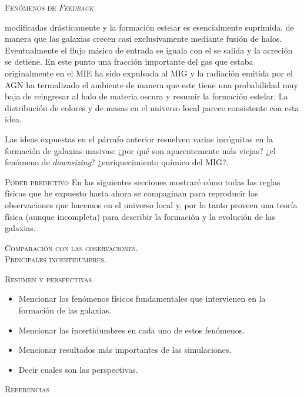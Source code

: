 \documentclass[xcolor=dvipsnames,4pt,hyperref={colorlinks,citecolor=black,linkcolor=black,urlcolor=black}]{beamer}
\begin{document}
\begin{frame}[allowframebreaks]{\textsc{Fenómenos de \emph{Feedback}}}
\begin{description}
modificadas drásticamente y la formación estelar es esencialmente suprimida, de manera que las
galaxias crecen casi exclusivamente mediante fusión de halos. Eventualmente el flujo másico de
entrada se iguala con el se salida y la acreción se detiene. En este punto una fracción importante
del gas que estaba originalmente en el MIE ha sido expulsada al MIG y la radiación emitida por el
AGN ha termalizado el ambiente de manera que este tiene una probabilidad muy baja de reingresar al
halo de materia oscura y resumir la formación estelar. La distribución de colores y de masas en el
universo local parece consistente con esta idea.

Las ideas expuestas en el párrafo anterior resuelven varias incógnitas en la formación de galaxias
masivas: ¿por qué son aparentemente más viejas? ¿el fenómeno de \emph{downsizing}? ¿enriquecimiento
químico del MIG?.
%
\end{description}
%
\end{frame}

\begin{frame}[allowframebreaks]{\textsc{Poder predictivo}}
%
En las siguientes secciones mostraré cómo todas las reglas físicas que he expuesto hasta ahora se
compaginan para reproducir las observaciones que hacemos en el universo local y, por lo tanto
proveen una teoría física (aunque incompleta) para describir la formación y la evolución de las
galaxias.
%

\begin{description}
%
\item[\textsc{Comparación con las observaciones.}]

%
\item[\textsc{Principales incertidumbres.}]

%
\end{description}
%
%
\end{frame}

\begin{frame}[allowframebreaks]{\textsc{Resumen y perspectivas}}
%
\begin{itemize}
\item Mencionar los fenómenos físicos fundamentales que intervienen en la formación de las galaxias.
\item Mencionar las incertidumbres en cada uno de estos fenómenos.
\item Mencionar resultados más importantes de las simulaciones.
\item Decir cuales son las perspectivas.
\end{itemize}
%
\end{frame}

\begin{frame}[allowframebreaks]{\textsc{Referencias}}
\printbibliography
\end{frame}
\end{document}
